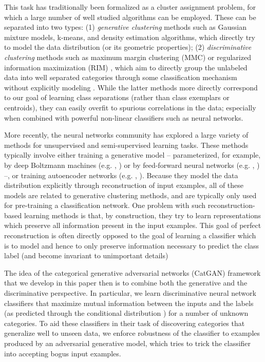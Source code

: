 \documentclass{article} \usepackage{iclr2016_conference,times}
\begin{document}
This task has traditionally been formalized as a cluster assignment
problem, for which a large number of well studied algorithms can be
employed. These can be separated into two types: (1)
\emph{generative clustering} methods such as Gaussian mixture models,
k-means, and density estimation algorithms, which directly try to model
the data distribution  (or its geometric properties); (2)
\emph{discriminative clustering} methods such as maximum margin
clustering (MMC) \citep{MMC_2004} or regularized information
maximization (RIM) \citep{Krause_2010}, which aim to directly group
the unlabeled data into well separated categories through some
classification mechanism without explicitly modeling . While
the latter methods more directly correspond to our goal of learning
class separations (rather than class exemplars or centroids), they can
easily overfit to spurious correlations in the data; especially when
combined with powerful non-linear classifiers such as neural networks.

More recently, the neural networks community has explored a large
variety of methods for unsupervised and semi-supervised learning
tasks. These methods typically involve either training a generative
model -- parameterized, for example, by deep Boltzmann machines
(e.g. \citet{SalHinton07}, \citet{Goodfellow_NIPS2013}) or by
feed-forward neural networks (e.g. \citet{Bengio_ICML2014},
\citet{Kingma_NIPS2014}) --, or training autoencoder networks
(e.g. \citet{HintonSalakhutdinov2006b},
\citet{VincentPLarochelleH2008}). Because they model the data
distribution explicitly through reconstruction of input examples, all
of these models are related to generative clustering methods, and are
typically only used for pre-training a classification network.  One
problem with such reconstruction-based learning methods is that, by
construction, they try to learn representations which preserve all
information present in the input examples. This goal of perfect
reconstruction is often directly opposed to the goal of learning a
classifier which is to model  and hence to only preserve
information necessary to predict the class label (and become invariant
to unimportant details)

The idea of the categorical generative adversarial networks (CatGAN)
framework that we develop in this paper then is to combine both the
generative and the discriminative perspective. In particular, we learn
discriminative neural network classifiers  that maximize mutual
information between the inputs  and the labels  (as predicted
through the conditional distribution ) for a number
of  unknown categories. To aid these classifiers in their task of
discovering categories that generalize well to unseen data, we enforce
robustness of the classifier to examples produced by an adversarial
generative model, which tries to trick the classifier into accepting
bogus input examples.
\end{document}
